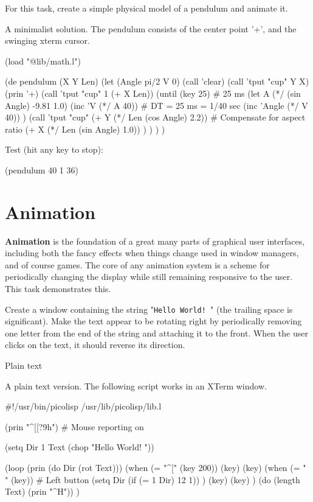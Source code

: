 For this task, create a simple physical model of a pendulum and animate
it.



\begin{wideverbatim}

A minimalist solution. The pendulum consists of the center point '+', and the
swinging xterm cursor.

(load "@lib/math.l")

(de pendulum (X Y Len)
   (let (Angle pi/2  V 0)
      (call 'clear)
      (call 'tput "cup" Y X)
      (prin '+)
      (call 'tput "cup" 1 (+ X Len))
      (until (key 25)                        # 25 ms
         (let A (*/ (sin Angle) -9.81 1.0)
            (inc 'V (*/ A 40))               # DT = 25 ms = 1/40 sec
            (inc 'Angle (*/ V 40)) )
         (call 'tput "cup"
            (+ Y (*/ Len (cos Angle) 2.2))   # Compensate for aspect ratio
            (+ X (*/ Len (sin Angle) 1.0)) ) ) ) )

Test (hit any key to stop):

(pendulum 40 1 36)

\end{wideverbatim}

\pagebreak{}
\section*{Animation}

\textbf{Animation} is the foundation of a great many parts of
graphical user interfaces, including both the fancy effects when
things change used in window managers, and of course games. The core
of any animation system is a scheme for periodically changing the
display while still remaining responsive to the user. This task
demonstrates this.

Create a window containing the string "\texttt{Hello World! }" (the
trailing space is significant). Make the text appear to be rotating
right by periodically removing one letter from the end of the string and
attaching it to the front. When the user clicks on the text, it should
reverse its direction.


\begin{wideverbatim}

Plain text

A plain text version. The following script works in an XTerm window.

#!/usr/bin/picolisp /usr/lib/picolisp/lib.l

(prin "^[[?9h")  # Mouse reporting on

(setq Dir 1  Text (chop "Hello World! "))

(loop
   (prin (do Dir (rot Text)))
   (when (= "^[" (key 200))
      (key) (key)
      (when (= " " (key))  # Left button
         (setq Dir (if (= 1 Dir) 12 1)) )
      (key) (key) )
   (do (length Text) (prin "^H")) )

\end{wideverbatim}

